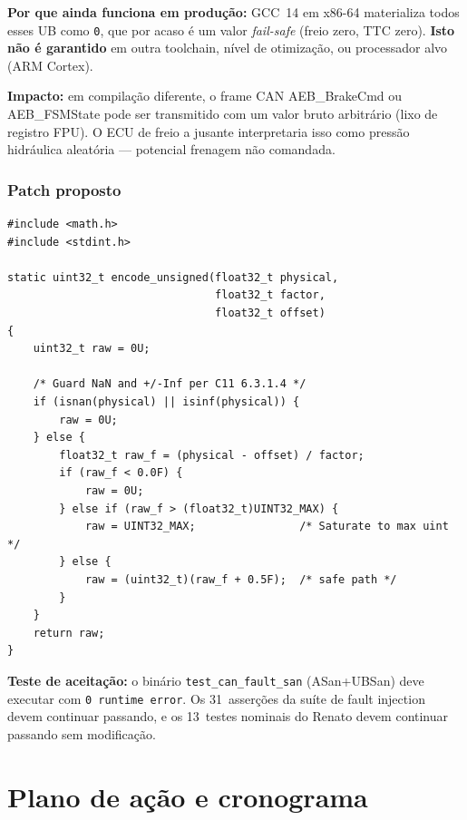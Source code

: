 \documentclass[12pt]{article}
\begin{document}
\textbf{Por que ainda funciona em produção:} GCC~14 em x86-64 materializa todos esses UB como
\texttt{0}, que por acaso é um valor \textit{fail-safe} (freio zero, TTC zero). \textbf{Isto não é
garantido} em outra toolchain, nível de otimização, ou processador alvo (ARM Cortex).

\textbf{Impacto:} em compilação diferente, o frame CAN AEB\_BrakeCmd ou AEB\_FSMState pode ser
transmitido com um valor bruto arbitrário (lixo de registro FPU). O ECU de freio a jusante
interpretaria isso como pressão hidráulica aleatória --- potencial frenagem não comandada.

\subsubsection*{Patch proposto}

\begin{lstlisting}[caption={Normalização explícita de NaN/Inf e saturação.}]
#include <math.h>
#include <stdint.h>

static uint32_t encode_unsigned(float32_t physical,
                                float32_t factor,
                                float32_t offset)
{
    uint32_t raw = 0U;

    /* Guard NaN and +/-Inf per C11 6.3.1.4 */
    if (isnan(physical) || isinf(physical)) {
        raw = 0U;
    } else {
        float32_t raw_f = (physical - offset) / factor;
        if (raw_f < 0.0F) {
            raw = 0U;
        } else if (raw_f > (float32_t)UINT32_MAX) {
            raw = UINT32_MAX;                /* Saturate to max uint */
        } else {
            raw = (uint32_t)(raw_f + 0.5F);  /* safe path */
        }
    }
    return raw;
}
\end{lstlisting}

\textbf{Teste de aceitação:} o binário \texttt{test\_can\_fault\_san} (ASan+UBSan) deve executar com
\texttt{0~runtime error}. Os 31~asserções da suíte de fault injection devem continuar passando, e os
13~testes nominais do Renato devem continuar passando sem modificação.

\section{Plano de ação e cronograma}
\end{document}

